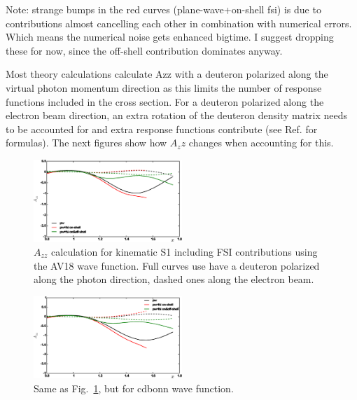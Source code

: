 Note: strange bumps in the red curves (plane-wave+on-shell fsi) is due to 
contributions almost cancelling each other in combination with numerical 
errors.  Which means the numerical noise gets enhanced bigtime.  I suggest 
dropping these for now, since the off-shell contribution dominates anyway.

Most theory calculations calculate Azz with a deuteron polarized along the 
virtual photon momentum direction as this limits the number of response 
functions included in the cross section.  For a deuteron polarized along the 
electron beam direction, an extra rotation of the deuteron density matrix needs 
to be accounted for and extra response functions contribute (see Ref. 
\cite{Cosyn:2014sqa} for formulas).  The next figures show how $A_zz$ changes 
when accounting for this.

\begin{figure}[htb]
\begin{center}
  \includegraphics[width=0.5\textwidth]{figs/beampol_av18_kin1.eps}
\caption{$A_{zz}$ calculation for kinematic S1 including FSI contributions 
using the AV18 wave function.  
Full curves use have a deuteron polarized along the photon direction, dashed 
ones along the electron beam.}
\label{fig:beampol1}       %
\end{center}
\end{figure}

\begin{figure}[htb]
\begin{center}
  \includegraphics[width=0.5\textwidth]{figs/beampol_cdbonn_kin1.eps}
\caption{Same as Fig.~\ref{fig:beampol1}, but for cdbonn wave function.}
\label{fig:beampol2}       %
\end{center}
\end{figure}


